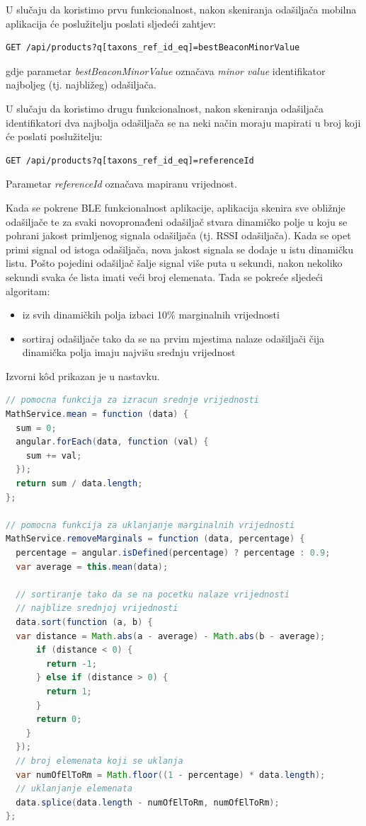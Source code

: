 U slučaju da koristimo prvu funkcionalnost, nakon skeniranja odašiljača mobilna aplikacija će poslužitelju poslati sljedeći zahtjev:
\begin{lstlisting}
GET /api/products?q[taxons_ref_id_eq]=bestBeaconMinorValue
\end{lstlisting}
gdje parametar \textit{bestBeaconMinorValue} označava \textit{minor value} identifikator najboljeg (tj. najbližeg) odašiljača.

U slučaju da koristimo drugu funkcionalnost, nakon skeniranja odašiljača identifikatori dva najbolja odašiljača se na neki način moraju mapirati u broj koji će poslati poslužitelju:
\begin{lstlisting}
GET /api/products?q[taxons_ref_id_eq]=referenceId
\end{lstlisting}
Parametar \textit{referenceId} označava mapiranu vrijednost.

Kada se pokrene BLE funkcionalnost aplikacije, aplikacija skenira sve obližnje odašiljače te za svaki novopronađeni odašiljač stvara dinamičko polje u koju se pohrani jakost primljenog signala odašiljača (tj. RSSI odašiljača). 
Kada se opet primi signal od istoga odašiljača, nova jakost signala se dodaje u istu dinamičku listu. 
Pošto pojedini odašiljač šalje signal više puta u sekundi, nakon nekoliko sekundi svaka će lista imati veći broj elemenata.
Tada se pokreće sljedeći algoritam:
\begin{itemize}
    \item iz svih dinamičkih polja izbaci 10\% marginalnih vrijednosti
    \item sortiraj odašiljače tako da se na prvim mjestima nalaze odašiljači čija dinamička polja imaju najvišu srednju vrijednost
\end{itemize}
Izvorni kôd prikazan je u nastavku.

\begin{lstlisting}[language=java, morekeywords={var,function}]
// pomocna funkcija za izracun srednje vrijednosti
MathService.mean = function (data) {
  sum = 0;
  angular.forEach(data, function (val) {
    sum += val;
  });
  return sum / data.length;
};

// pomocna funkcija za uklanjanje marginalnih vrijednosti
MathService.removeMarginals = function (data, percentage) {
  percentage = angular.isDefined(percentage) ? percentage : 0.9;
  var average = this.mean(data);
  
  // sortiranje tako da se na pocetku nalaze vrijednosti
  // najblize srednjoj vrijednosti
  data.sort(function (a, b) {
  var distance = Math.abs(a - average) - Math.abs(b - average);
      if (distance < 0) {
        return -1;
      } else if (distance > 0) {
        return 1;
      }
      return 0;
    }
  });
  // broj elemenata koji se uklanja
  var numOfElToRm = Math.floor((1 - percentage) * data.length);
  // uklanjanje elemenata
  data.splice(data.length - numOfElToRm, numOfElToRm);
};
\end{lstlisting}

